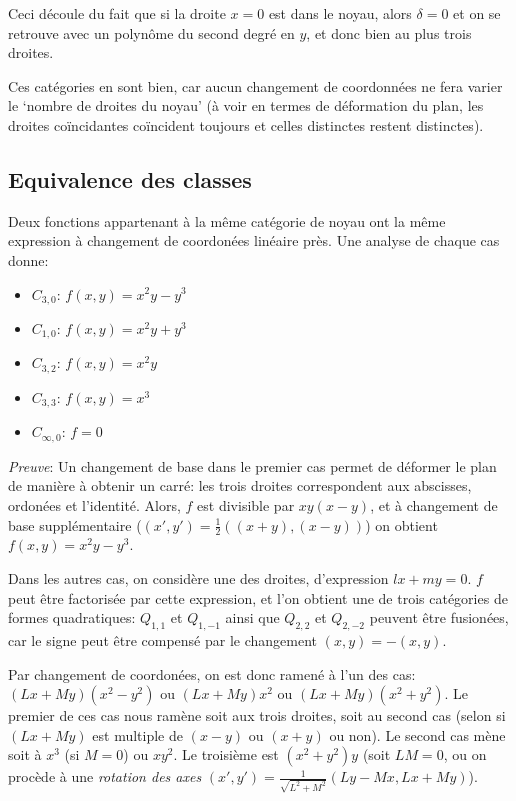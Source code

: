 \documentclass[a4paper]{article}
\begin{document}
Ceci découle du fait que si la droite $x=0$ est dans le noyau, alors $\delta=0$ et on se retrouve avec un polynôme du second degré en $y$, et donc bien au plus trois droites.

Ces catégories en sont bien, car aucun changement de coordonnées ne fera varier le `nombre de droites du noyau' (à voir en termes de déformation du plan, les droites coïncidantes coïncident toujours et celles distinctes restent distinctes).

\subsection{Equivalence des classes}

Deux fonctions appartenant à la même catégorie de noyau ont la même expression à changement de coordonées linéaire près. Une analyse de chaque cas donne:


\begin{itemize}
\item  $C_{3,0}$: $f(x,y)=x^2y-y^3$
\item  $C_{1,0}$: $f(x,y)=x^2y+y^3$
\item  $C_{3,2}$: $f(x,y)=x^2y$
\item  $C_{3,3}$: $f(x,y)=x^3$
\item  $C_{\infty,0}$: $f=0$

\end{itemize}

\textit{Preuve}: Un changement de base dans le premier cas permet de déformer le plan de manière à obtenir un carré: les trois droites correspondent aux abscisses, ordonées et l'identité. Alors, $f$ est divisible par $xy(x-y)$, et à changement de base supplémentaire ($(x',y')=\frac{1}{2}((x+y),(x-y))$) on obtient $f(x,y)=x^2y-y^3$.

Dans les autres cas, on considère une des droites, d'expression $lx+my=0$. $f$ peut être factorisée par cette expression, et l'on obtient une de trois catégories de formes quadratiques: $Q_{1,1}$ et $Q_{1,-1}$ ainsi que $Q_{2,2}$ et $Q_{2,-2}$ peuvent être fusionées, car le signe peut être compensé par le changement $(x,y)=-(x,y)$.

Par changement de coordonées, on est donc ramené à l'un des cas: $(Lx+My)(x^2-y^2)$ ou $(Lx+My)x^2$ ou $(Lx+My)(x^2+y^2)$. Le premier de ces cas nous ramène soit aux trois droites, soit au second cas (selon si $(Lx+My)$ est multiple de $(x-y)$ ou $(x+y)$ ou non). Le second cas mène soit à $x^3$ (si $M=0$) ou $xy^2$. Le troisième est $(x^2+y^2)y$ (soit $LM=0$, ou on procède à une \textit{rotation des axes} $(x',y')=\frac{1}{\sqrt{L^2+M^2}}(Ly-Mx,Lx+My)$).
\end{document}
